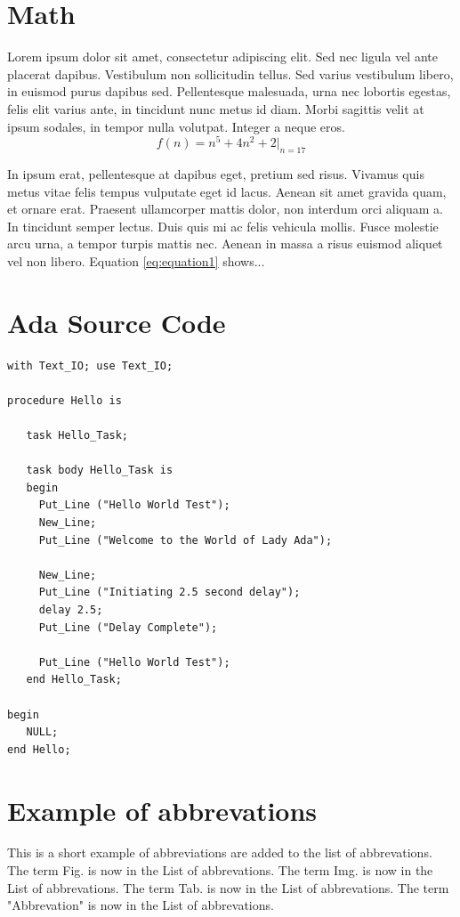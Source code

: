 \section{Math}
Lorem ipsum dolor sit amet, consectetur adipiscing elit. Sed nec ligula vel
ante placerat dapibus. Vestibulum non sollicitudin tellus. Sed varius
vestibulum libero, in euismod purus dapibus sed. Pellentesque malesuada, urna
nec lobortis egestas, felis elit varius ante, in tincidunt nunc metus id diam.
Morbi sagittis velit at ipsum sodales, in tempor nulla volutpat. Integer a
neque eros.
\begin{equation}
f(n) = n^5 + 4n^2 + 2 |_{n=17}
\label{eq:equation1}
\end{equation}

In ipsum erat, pellentesque at dapibus eget, pretium sed risus.
Vivamus quis metus vitae felis tempus vulputate eget id lacus. Aenean sit amet
gravida quam, et ornare erat. Praesent ullamcorper mattis dolor, non interdum
orci aliquam a. In tincidunt semper lectus. Duis quis mi ac felis vehicula
mollis. Fusce molestie arcu urna, a tempor turpis mattis nec. Aenean in massa a
risus euismod aliquet vel non libero. Equation \ref{eq:equation1} shows...

\section{Ada Source Code}
\lstset{language=[2005]Ada}
\begin{lstlisting}[frame=single]
with Text_IO; use Text_IO;

procedure Hello is

   task Hello_Task;

   task body Hello_Task is
   begin
     Put_Line ("Hello World Test");
     New_Line;
     Put_Line ("Welcome to the World of Lady Ada");

     New_Line;
     Put_Line ("Initiating 2.5 second delay");
     delay 2.5;
     Put_Line ("Delay Complete");

     Put_Line ("Hello World Test");
   end Hello_Task;

begin
   NULL;
end Hello;
\end{lstlisting}


\section{Example of abbrevations}
This is a short example of abbreviations are added to the list of abbrevations.
The term Fig. is now in the List of abbrevations.
The term Img. is now in the List of abbrevations.
The term Tab. is now in the List of abbrevations.
The term "Abbrevation" is now in the List of abbrevations.


